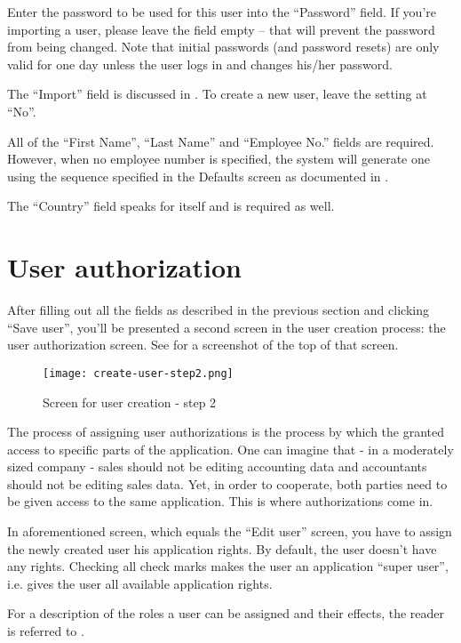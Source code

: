 Enter the password to be used for this user into the ``Password'' field. If you're
importing a user, please leave the field empty -- that will prevent the password
from being changed.  Note that initial passwords (and password resets) are only 
valid for one day unless the user logs in and changes his/her password.

The ``Import'' field is discussed in . To create a new
user, leave the setting at ``No''.

All of the ``First Name'', ``Last Name'' and ``Employee No.'' fields are required.
However, when no employee number is specified, the system will generate one using
the sequence specified in the Defaults screen as documented in
.

The ``Country'' field speaks for itself and is required as well.


\section{User authorization}


After filling out all the fields as described in the previous section and
clicking ``Save user'', you'll be presented
a second screen in the user creation process: the user authorization screen.
See  for a screenshot of the top of that screen.

\begin{figure}[h]
\texttt{[image: create-user-step2.png]}
\caption{Screen for user creation - step 2}
\label{fig:create-user-step2}
\end{figure}


The process of assigning user authorizations is the process by which the granted
access to specific parts of the application. One can imagine that - in a moderately
sized company - sales should not be editing accounting data and accountants should
not be editing sales data. Yet, in order to cooperate, both parties need to be
given access to the same application. This is where authorizations come in.

In aforementioned screen, which equals the ``Edit user'' screen, you have to assign the
newly created user his application rights. By default, the user doesn't have any
rights. Checking all check marks makes the user an application ``super user'', i.e.
gives the user all available application rights.

For a description of the roles a user can be assigned and their effects, the
reader is referred to .


